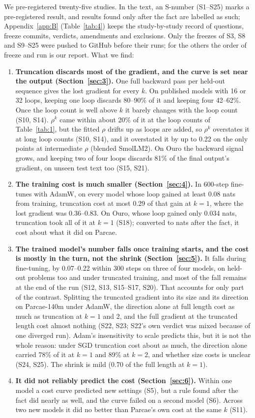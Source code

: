 \documentclass[10pt]{article}
\begin{document}
We pre-registered twenty-five studies. In the text, an S-number (S1--S25) marks a pre-registered result, and results found only after the fact are labelled as such; Appendix~\ref{app:B} (Table~\ref{tab:4}) keeps the study-by-study record of questions, freeze commits, verdicts, amendments and exclusions. Only the freezes of S3, S8 and S9--S25 were pushed to GitHub before their runs; for the others the order of freeze and run is our report. What we find:

\begin{enumerate}
\item \textbf{Truncation discards most of the gradient, and the curve is set near the output (Section~\ref{sec:3}).} One full backward pass per held-out sequence gives the lost gradient for every $k$. On published models with 16 or 32 loops, keeping one loop discards 80--90\% of it and keeping four 42--62\%. Once the loop count is well above $k$ it barely changes with the loop count (S10, S14). $\rho^{k}$ came within about 20\% of it at the loop counts of Table~\ref{tab:1}, but the fitted $\rho$ drifts up as loops are added, so $\rho^{k}$ overstates it at long loop counts (S10, S14), and it overstated it by up to 0.22 on the only points at intermediate $\rho$ (blended SmolLM2). On Ouro the backward signal grows, and keeping two of four loops discards 81\% of the final output's gradient, on unseen test text too (S15, S21).
\item \textbf{The training cost is much smaller (Section~\ref{sec:4}).} In 600-step fine-tunes with AdamW, on every model whose loop gained at least 0.08 nats from training, truncation cost at most 0.29 of that gain at $k = 1$, where the lost gradient was 0.36--0.83. On Ouro, whose loop gained only 0.034 nats, truncation took all of it at $k = 1$ (S18); converted to nats after the fact, it cost about what it did on Parcae.
\item \textbf{The trained model's number falls once training starts, and the cost is mostly in the turn, not the shrink (Section~\ref{sec:5}).} It falls during fine-tuning, by 0.07--0.22 within 300 steps on three of four models, on held-out problems too and under truncated training, and most of the fall remains at the end of the run (S12, S13, S15--S17, S20). That accounts for only part of the contrast. Splitting the truncated gradient into its size and its direction on Parcae-140m under AdamW, the direction alone at full length cost as much as truncation at $k = 1$ and 2, and the full gradient at the truncated length cost almost nothing (S22, S23; S22's own verdict was mixed because of one diverged run). Adam's insensitivity to scale predicts this, but it is not the whole reason: under SGD truncation cost about as much, the direction alone carried 78\% of it at $k = 1$ and 89\% at $k = 2$, and whether size costs is unclear (S24, S25). The shrink is mild (0.70 of the full length at $k = 1$).
\item \textbf{It did not reliably predict the cost (Section~\ref{sec:6}).} Within one model a cost curve predicted new settings (S5), but a rule found after the fact did nearly as well, and the curve failed on a second model (S6). Across two new models it did no better than Parcae's own cost at the same $k$ (S11).
\end{enumerate}
\end{document}
